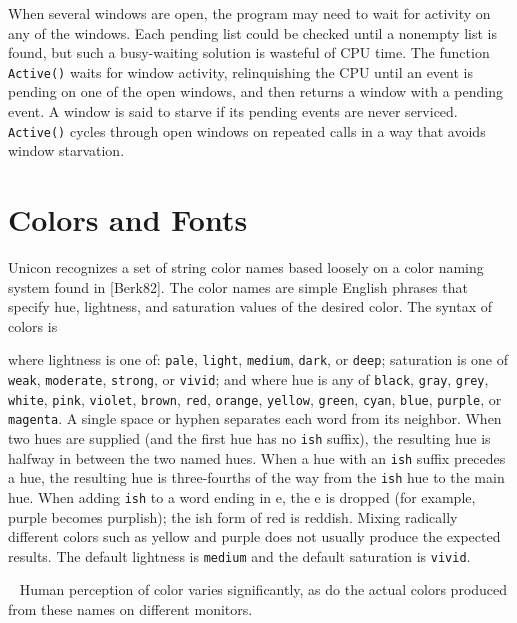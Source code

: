 When several windows are open, the program may need to wait for
activity on any of the windows. Each pending list could be checked
until a nonempty list is found, but such a busy-waiting solution is
wasteful of CPU time. The function \texttt{Active()} waits for window
activity, relinquishing the CPU until an event is pending on one of
the open windows, and then returns a window with a pending event. A
window is said to starve if its pending events are never
serviced. \texttt{Active()} cycles through open windows on repeated
calls in a way that avoids window starvation.

\section{Colors and Fonts}

Unicon recognizes a set of string color names based loosely on a color
naming system found in [Berk82]. The color names are simple English
phrases that specify hue, lightness, and saturation values of the
desired color. The syntax of colors is


\noindent
where lightness is one of: \texttt{pale}, \texttt{light},
\texttt{medium}, \texttt{dark}, or \texttt{deep}; saturation is one of
\texttt{weak}, \texttt{moderate}, \texttt{strong}, or \texttt{vivid};
and where hue is any of \texttt{black}, \texttt{gray}, \texttt{grey},
\texttt{white}, \texttt{pink}, \texttt{violet}, \texttt{brown},
\texttt{red}, \texttt{orange}, \texttt{yellow}, \texttt{green},
\texttt{cyan}, \texttt{blue}, \texttt{purple}, or \texttt{magenta}. A
single space or hyphen separates each word from its neighbor. When two
hues are supplied (and the first hue has no \texttt{ish} suffix), the
resulting hue is halfway in between the two named hues. When a hue
with an \texttt{ish} suffix precedes a hue, the resulting hue is
three-fourths of the way from the \texttt{ish} hue to the main
hue. When adding \texttt{ish} to a word ending in e, the e is dropped
(for example, purple becomes purplish); the ish form of red is
reddish. Mixing radically different colors such as yellow and purple
does not usually produce the expected results. The default lightness
is \texttt{medium} and the default saturation is \texttt{vivid}.

\medskip{}\ {\sffamily
Human perception of color varies significantly, as do the actual
colors produced from these names on different monitors.}\medskip


